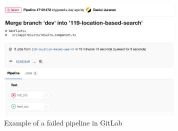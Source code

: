 \begin{figure}[H]
\begin{center}
\includegraphics[width=9cm]{figures/cicd_failed_pipeline}
\end{center}
\caption{Example of a failed pipeline in GitLab}
\label{fig:cicd_failed_pipeline}
\end{figure}
